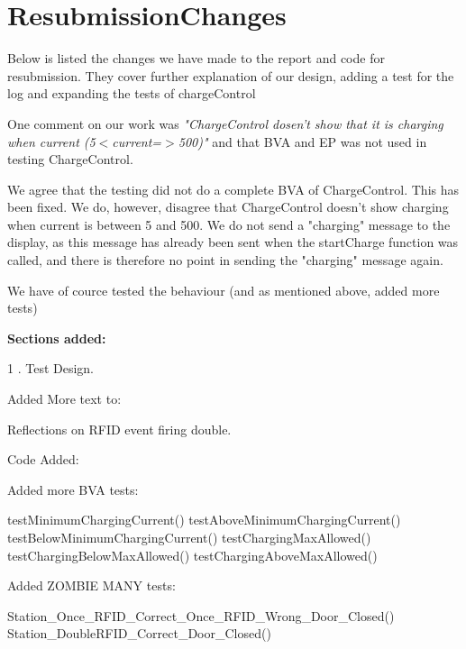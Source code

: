 \section{ResubmissionChanges}

Below is listed the changes we have made to the report and code for resubmission.
They cover further explanation of our design, adding a test for the log and expanding the tests of chargeControl

One comment on our work was \emph{"ChargeControl dosen't show that it is charging when current (5$<$current=$>$500)"} and that BVA and EP was not used in testing ChargeControl.

We agree that the testing did not do a complete BVA of ChargeControl. This has been fixed. We do, however, disagree that ChargeControl doesn't show charging when current is between 5 and 500. We do not send a "charging" message to the display, as this message has already been sent when the startCharge function was called, and there is therefore no point in sending the "charging" message again.

We have of cource tested the behaviour (and as mentioned above, added more tests) 


\textbf{Sections added:}

1 . Test Design. 

Added More text to:

Reflections on RFID event firing double. 

Code Added: 

Added more BVA tests:

testMinimumChargingCurrent()
testAboveMinimumChargingCurrent()
testBelowMinimumChargingCurrent()
testChargingMaxAllowed()
testChargingBelowMaxAllowed()
testChargingAboveMaxAllowed()

Added ZOMBIE MANY tests: 

Station_Once_RFID_Correct_Once_RFID_Wrong_Door_Closed()
Station_DoubleRFID_Correct_Door_Closed()